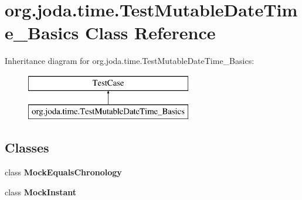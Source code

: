 \hypertarget{classorg_1_1joda_1_1time_1_1_test_mutable_date_time___basics}{\section{org.\-joda.\-time.\-Test\-Mutable\-Date\-Time\-\_\-\-Basics Class Reference}
\label{classorg_1_1joda_1_1time_1_1_test_mutable_date_time___basics}
}
Inheritance diagram for org.\-joda.\-time.\-Test\-Mutable\-Date\-Time\-\_\-\-Basics\-:\begin{figure}[H]
\begin{center}
\leavevmode
\includegraphics[height=2.000000cm]{classorg_1_1joda_1_1time_1_1_test_mutable_date_time___basics}
\end{center}
\end{figure}
\subsection*{Classes}
\begin{DoxyCompactItemize}
\item 
class {\bfseries Mock\-Equals\-Chronology}
\item 
class {\bfseries Mock\-Instant}
\end{DoxyCompactItemize}
